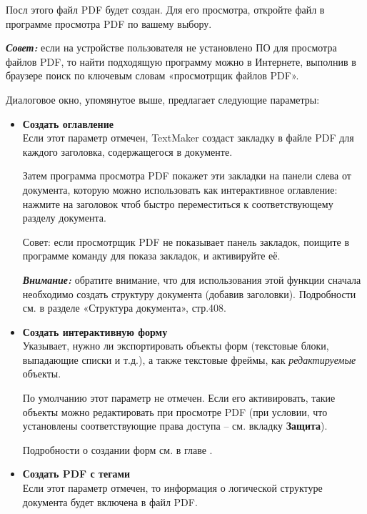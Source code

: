 ﻿\documentclass[a4paper,10pt]{article}
\begin{document}
Посл этого файл PDF будет создан. Для его просмотра, откройте файл в программе просмотра PDF по вашему выбору.

\begin{mdframed}[backgroundcolor=blue!10]
\textbf{\textit{Совет:}} если на устройстве пользователя не установлено ПО для просмотра файлов PDF, то найти подходящую программу можно в Интернете, выполнив в браузере поиск по ключевым словам «просмотрщик файлов PDF».
\end{mdframed}

Диалоговое окно, упомянутое выше, предлагает следующие параметры:
\begin{itemize}
 \item \textbf{Создать оглавление}\\
 Если этот параметр отмечен, TextMaker создаст закладку в файле PDF для каждого заголовка, содержащегося в документе.
 
 Затем программа просмотра PDF покажет эти закладки на панели слева от документа, которую можно использовать как интерактивное оглавление: нажмите на заголовок чтоб быстро переместиться к соответствующему разделу документа.
 
 Совет: если просмотрщик PDF не показывает панель закладок, поищите в программе команду для показа закладок, и активируйте её.
 
 \begin{mdframed}[backgroundcolor=blue!10]
\textbf{\textit{Внимание:}} обратите внимание, что для использования этой функции сначала необходимо создать структуру документа (добавив заголовки). Подробности см. в разделе «Структура документа», стр.408.
\end{mdframed}
\item \textbf{Создать интерактивную форму}\\
Указывает, нужно ли экспортировать объекты форм (текстовые блоки, выпадающие списки и т.д.), а также текстовые фреймы, как \textit{редактируемые} объекты.

По умолчанию этот параметр не отмечен. Если его активировать, такие объекты можно редактировать при просмотре PDF (при условии, что установлены соответствующие права доступа -- см. вкладку \textbf{Защита}).

Подробности о создании форм см. в главе .
\item \textbf{Создать PDF с тегами}\\
Если этот параметр отмечен, то информация о логической структуре документа будет включена в файл PDF.


\end{itemize}
\end{document}
